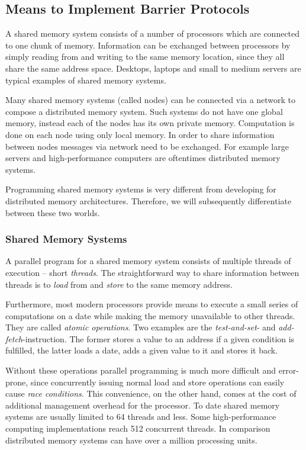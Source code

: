 \documentclass[a4paper, 10pt]{article}
\begin{document}
\subsection{Means to Implement Barrier Protocols}
\label{ssec:background-means}
A shared memory system consists of a number of processors which are connected to one chunk of memory. Information can be exchanged between processors by simply reading from and writing to the same memory location, since they all share the same address space.
Desktops, laptops and small to medium servers are typical examples of shared memory systems.

Many shared memory systems (called nodes) can be connected via a network to compose a distributed memory system. Such systems do not have one global memory, instead each of the nodes has its own private memory. Computation is done on each node using only local memory. In order to share information between nodes messages via network need to be exchanged.
For example large servers and high-performance computers are oftentimes distributed memory systems.

Programming shared memory systems is very different from developing for distributed memory architectures. Therefore, we will subsequently differentiate between these two worlds.

\subsubsection{Shared Memory Systems}
\label{sssec:background-means-shared}
A parallel program for a shared memory system consists of multiple threads of execution -- short \emph{threads}. 
The straightforward way to share information between threads is to \emph{load} from and \emph{store} to the same memory address.

Furthermore, most modern processors provide means to execute a small series of computations on a date while making the memory unavailable to other threads. They are called \emph{atomic operations}. Two examples are the \emph{test-and-set}- and \emph{add-fetch}-instruction. The former stores a value to an address if a given condition is fulfilled, the latter loads a date, adds a given value to it and stores it back.

Without these operations parallel programming is much more difficult and error-prone, since concurrently issuing normal load and store operations can easily cause \emph{race conditions}. This convenience, on the other hand, comes at the cost of additional management overhead for the processor. To date shared memory systems are usually limited to 64 threads and less. Some high-performance computing implementations reach 512 concurrent threads. In comparison distributed memory systems can have over a million processing units.
\end{document}

